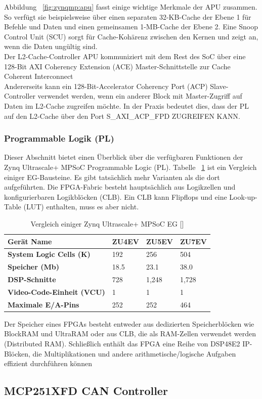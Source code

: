 Abbildung ~\ref{fig:zynqmp:apu} fasst einige wichtige Merkmale der APU zusammen. So verfügt sie beispielsweise über einen separaten 32-KB-Cache der Ebene 1 für Befehle und Daten und einen gemeinsamen 1-MB-Cache der Ebene 2. Eine Snoop Control Unit (SCU) sorgt für Cache-Kohärenz zwischen den Kernen und zeigt an, wenn die Daten ungültig sind.\\
Der L2-Cache-Controller APU kommuniziert mit dem Rest des SoC über eine 128-Bit AXI Coherency Extension (ACE) Master-Schnittstelle zur Cache Coherent Interconnect\\
Andererseits kann ein 128-Bit-Accelerator Coherency Port (ACP) Slave-Controller verwendet werden, wenn ein anderer Block mit Master-Zugriff auf Daten im L2-Cache zugreifen möchte. In der Praxis bedeutet dies, dass der PL auf den L2-Cache über den Port S_AXI_ACP_FPD ZUGREIFEN KANN.

\subsubsection{Programmable Logik (PL)}
Dieser Abschnitt bietet einen Überblick über die verfügbaren Funktionen der Zynq Ultrascale+ MPSoC Programmable Logic (PL). Tabelle ~\ref{tab:zcu:vergleich} ist ein Vergleich einiger EG-Bausteine. Es gibt tatsächlich mehr Varianten als die dort aufgeführten. Die FPGA-Fabric besteht hauptsächlich aus Logikzellen und konfigurierbaren Logikblöcken (CLB). Ein CLB kann Flipflops und eine Look-up-Table (LUT) enthalten, muss es aber nicht.\\

\begin{table}[htbp]
	\centering
	\begin{tabular}{|p{5cm}|p{2cm}|p{2cm}|p{2cm}|}
		\toprule
		\textbf{Gerät Name} & ZU4EV & ZU5EV & ZU7EV \\
		\midrule
		\textbf{System Logic Cells (K)} & 192 & 256 & 504 \\
		\textbf{Speicher (Mb)} & 18.5 & 23.1 & 38.0 \\
		\textbf{DSP-Schnitte} & 728 & 1,248 & 1,728 \\
		\textbf{Video-Code-Einheit (VCU)} & 1 & 1 & 1 \\
		\textbf{Maximale E/A-Pins} & 252 & 252 & 464 \\
		\bottomrule
	\end{tabular}
	\caption[Vergleich einiger Zynq Ultrascale+ MPSoC EG ]{Vergleich einiger Zynq Ultrascale+ MPSoC EG [\cite{XilinxInc.}]}
	\label{tab:zcu:vergleich}
\end{table}

Der Speicher eines FPGAs besteht entweder aus dedizierten Speicherblöcken wie BlockRAM und UltraRAM oder aus CLB, die als RAM-Zellen verwendet werden (Distributed RAM). Schließlich enthält das FPGA eine Reihe von DSP48E2 IP-Blöcken, die Multiplikationen und andere arithmetische/logische Aufgaben effizient durchführen können

\subsection{MCP251XFD CAN Controller}





